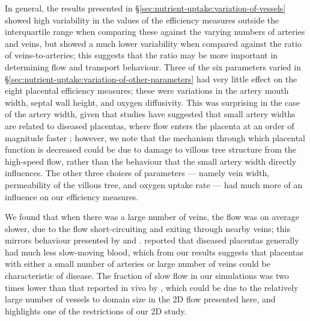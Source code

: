         In general, the results presented in \S\ref{sec:nutrient-uptake:variation-of-vessels} showed high variability in the values of the efficiency measures outside the interquartile range when comparing these against the varying numbers of arteries and veins, but showed a much lower variability when compared against the ratio of veins-to-arteries; this suggests that the ratio may be more important in determining flow and transport behaviour. Three of the six parameters varied in \S\ref{sec:nutrient-uptake:variation-of-other-parameters} had very little effect on the eight placental efficiency measures; these were variations in the artery mouth width, septal wall height, and oxygen diffusivity. This was surprising in the case of the artery width, given that studies have suggested that small artery widths are related to diseased placentas, where flow enters the placenta at an order of magnitude faster \cite{burtonRheologicalPhysiologicalConsequences2009}; however, we note that the mechanism through which placental function is decreased could be due to damage to villous tree structure from the high-speed flow, rather than the behaviour that the small artery width directly influences. The other three choices of parameters --- namely vein width, permeability of the villous tree, and oxygen uptake rate --- had much more of an influence on our efficiency measures.

        We found that when there was a large number of veins, the flow was on average slower, due to the flow short-circuiting and exiting through nearby veins; this mirrors behaviour presented by \citeauthor{chernyavskyMathematicalModelIntervillous2010} \cite{chernyavskyMathematicalModelIntervillous2010} and \citeauthor{meklerImpactTissuePorosity2022} \cite{meklerImpactTissuePorosity2022}. \citeauthor{dellschaftHaemodynamicsHumanPlacenta2020} reported that diseased placentas generally had much less slow-moving blood, which from our results suggests that placentas with either a small number of arteries or large number of veins could be characteristic of disease. The fraction of slow flow in our simulations was two times lower than that reported in vivo by \citeauthor{dellschaftHaemodynamicsHumanPlacenta2020} \cite{dellschaftHaemodynamicsHumanPlacenta2020}, which could be due to the relatively large number of vessels to domain size in the 2D flow presented here, and highlights one of the restrictions of our 2D study.

